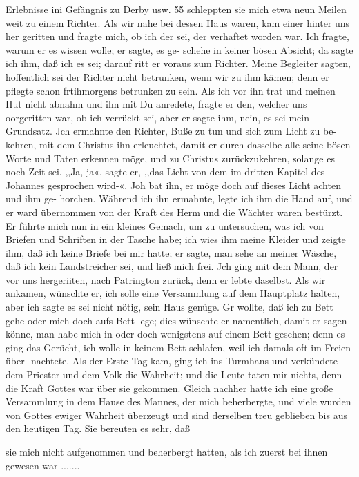Erlebnisse ini Gefängnis zu Derby usw. 55
schleppten sie mich etwa neun Meilen weit zu einem Richter.
Als wir nahe bei dessen Haus waren, kam einer hinter uns her
geritten und fragte mich, ob ich der sei, der verhaftet worden
war. Ich fragte, warum er es wissen wolle; er sagte, es ge-
schehe in keiner bösen Absicht; da sagte ich ihm, daß ich es
sei; darauf ritt er voraus zum Richter. Meine Begleiter sagten,
hoffentlich sei der Richter nicht betrunken, wenn wir zu ihm
kämen; denn er pflegte schon frtihmorgens betrunken zu sein.
Als ich vor ihn trat und meinen Hut nicht abnahm und ihn mit
Du anredete, fragte er den, welcher uns oorgeritten war, ob ich
verrückt sei, aber er sagte ihm, nein, es sei mein Grundsatz. Jch
ermahnte den Richter, Buße zu tun und sich zum Licht zu be-
kehren, mit dem Christus ihn erleuchtet, damit er durch dasselbe
alle seine bösen Worte und Taten erkennen möge, und zu Christus
zurückzukehren, solange es noch Zeit sei. ,,Ja, ja«, sagte er, ,,das
Licht von dem im dritten Kapitel des Johannes gesprochen wird-«.
Joh bat ihn, er möge doch auf dieses Licht achten und ihm ge-
horchen. Während ich ihn ermahnte, legte ich ihm die Hand auf,
und er ward übernommen von der Kraft des Herm und die
Wächter waren bestürzt. Er führte mich nun in ein kleines Gemach,
um zu untersuchen, was ich von Briefen und Schriften in der
Tasche habe; ich wies ihm meine Kleider und zeigte ihm, daß
ich keine Briefe bei mir hatte; er sagte, man sehe an meiner
Wäsche, daß ich kein Landstreicher sei, und ließ mich frei. Jch
ging mit dem Mann, der vor uns hergeriiten, nach Patrington
zurück, denn er lebte daselbst. Als wir ankamen, wünschte er, ich
solle eine Versammlung auf dem Hauptplatz halten, aber ich sagte
es sei nicht nötig, sein Haus genüge. Gr wollte, daß ich zu Bett
gehe oder mich doch aufs Bett lege; dies wünschte er namentlich,
damit er sagen könne, man habe mich in oder doch wenigstens
auf einem Bett gesehen; denn es ging das Gerücht, ich wolle
in keinem Bett schlafen, weil ich damals oft im Freien über-
nachtete. Als der Erste Tag kam, ging ich ins Turmhans
und verkündete dem Priester und dem Volk die Wahrheit; und
die Leute taten mir nichts, denn die Kraft Gottes war über sie
gekommen. Gleich nachher hatte ich eine große Versammlung in
dem Hause des Mannes, der mich beherbergte, und viele wurden
von Gottes ewiger Wahrheit überzeugt und sind derselben treu
geblieben bis aus den heutigen Tag. Sie bereuten es sehr, daß


sie mich nicht aufgenommen und beherbergt hatten, als ich zuerst
bei ihnen gewesen war .......


